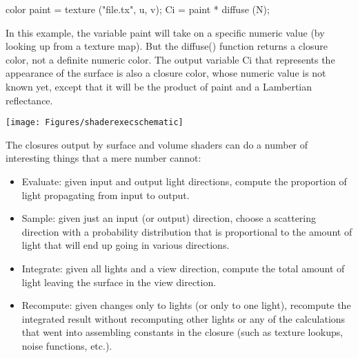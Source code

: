 \documentclass[11pt,letterpaper]{book}
\def\langname{Open Shading Language\xspace}
\def\color{{\cf color}\xspace}
\def\colorclosure{{\cf closure color}\xspace}
\begin{document}
\begin{code}
    color paint = texture ("file.tx", u, v);
    Ci = paint * diffuse (N);
\end{code}

\noindent In this example, the variable {\cf paint} will take on a
specific numeric value (by looking up from a texture map).  But the {\cf
  diffuse()} function returns a \colorclosure, not a definite numeric
\color.  The output variable {\cf Ci} that represents the appearance of
the surface is also a \colorclosure, whose numeric value is not known
yet, except that it will be the product of {\cf paint} and a Lambertian
reflectance.

\bigskip

\texttt{[image: Figures/shaderexecschematic]}

\medskip

The closures output by surface and volume shaders can do a number of
interesting things that a mere number cannot:

\begin{itemize}
\item Evaluate: given input and output light directions, compute the
  proportion of light propagating from input to output.
\item Sample: given just an input (or output) direction, choose a
  scattering direction with a probability distribution that is
  proportional to the amount of light that will end up going in various
  directions.
\item Integrate: given all lights and a view direction, compute
  the total amount of light leaving the surface in the view direction.
\item Recompute: given changes only to lights (or only to one light),
  recompute the integrated result without recomputing other lights or
  any of the calculations that went into assembling constants in the
  closure (such as texture lookups, noise functions, etc.).
\end{itemize}

\end{document}
